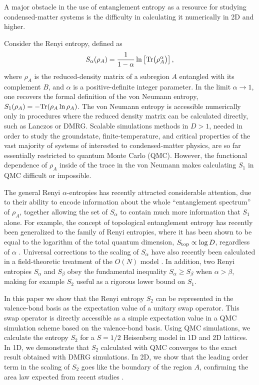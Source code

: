 \documentclass[prl,aps,twocolumn,floatfix,amsmath,amssymb,superscriptaddress,tightenlines]{revtex4}
\begin{document}
A major obstacle in the use of entanglement entropy as a resource for studying condensed-matter systems is 
the difficulty in calculating it numerically in 2D and higher.

Consider the Renyi entropy, defined as 
\begin{equation}
S_{\alpha} (\rho_A) = \frac{1}{1- \alpha} \ln \left[{ {\rm Tr}\big( \rho_A^{\alpha} \big) }\right],
\end{equation}
where $\rho_A$ is the reduced-density matrix of a subregion $A$ entangled with its complement $B$, and 
$\alpha$ is a positive-definite integer parameter.  In the limit $\alpha \rightarrow 1$, one recovers the formal 
definition of the von Neumann entropy, $S_1 (\rho_A) = - {\rm Tr}( \rho_A \ln \rho_A )$.  The von Neumann entropy
is accessible numerically only in procedures where the reduced density matrix can be calculated directly, such as Lanczos 
or DMRG.  Scalable simulations methods in $D>1$, needed in order to study the groundstate, finite-temperature, and 
critical properties of the vast majority of systems of interested to condensed-matter physics, are so far essentially
restricted to quantum Monte Carlo (QMC).  However, the functional dependence of $\rho_A$ inside of the trace in the 
von Neumann makes calculating $S_1$ in QMC difficult or impossible.  

The general Renyi $\alpha$-entropies has recently attracted considerable attention, due to their ability to encode
information about the whole ``entanglement spectrum'' of $\rho_A$, together allowing the set of $S_{\alpha}$ to contain 
much more information that $S_1$ alone.  For example, the concept of topological entanglement entropy has recently been
generalized to the family of Renyi entropies, where it has been shown to be equal to the logarithm of the total quantum 
dimension, $S_{\rm top} \propto \log D$, regardless of $\alpha$ \cite{PI}.  Universal corrections to the scaling of $S_{\alpha}$ 
have also recently been calculated in a field-theoretic treatment of the $O(N)$ model \cite{Max}.
In addition, two Renyi entropies $S_{\alpha}$ and $S_{\beta}$ obey the fundamental
inequality $S_{\alpha} \geq S_{\beta}$ when $\alpha > \beta$, making for example $S_2$ useful as a rigorous
lower bound on $S_1$.  

In this paper we show that the Renyi entropy $S_2$ can be represented in the valence-bond basis as the expectation
value of a unitary swap operator.  This swap operator is directly accessible as a simple expectation value in a QMC simulation scheme
based on the valence-bond basis.  Using QMC simulations, we calculate the entropy $S_2$ for a $S=1/2$ Heisenberg model
in 1D and 2D lattices.  In 1D, we demonstrate that $S_2$ calculated with QMC converges to the exact result obtained with DMRG simulations.  In 2D, we show that the leading order term in the scaling of $S_2$ goes like the boundary of the region $A$, 
confirming the area law expected from recent studies \cite{Ann}.
\end{document}

